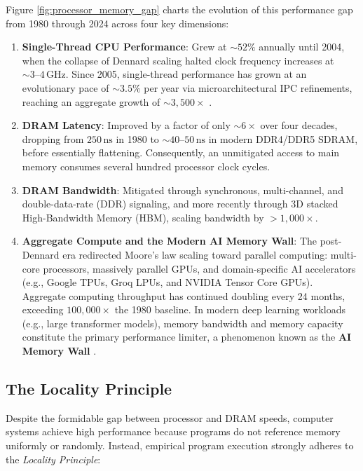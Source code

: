 Figure \ref{fig:processor_memory_gap} charts the evolution of this performance gap from 1980 through 2024 across four key dimensions:
\begin{enumerate}
    \item \textbf{Single-Thread CPU Performance}: Grew at $\sim 52\%$ annually until 2004, when the collapse of Dennard scaling halted clock frequency increases at $\sim 3\text{--}4\,\text{GHz}$. Since 2005, single-thread performance has grown at an evolutionary pace of $\sim 3.5\%$ per year via microarchitectural IPC refinements, reaching an aggregate growth of $\sim 3,500\times$ \cite{rupp2020microprocessor}.
    \item \textbf{DRAM Latency}: Improved by a factor of only $\sim 6\times$ over four decades, dropping from $250\,\text{ns}$ in 1980 to $\sim 40\text{--}50\,\text{ns}$ in modern DDR4/DDR5 SDRAM, before essentially flattening. Consequently, an unmitigated access to main memory consumes several hundred processor clock cycles.
    \item \textbf{DRAM Bandwidth}: Mitigated through synchronous, multi-channel, and double-data-rate (DDR) signaling, and more recently through 3D stacked High-Bandwidth Memory (HBM), scaling bandwidth by $>1,000\times$.
    \item \textbf{Aggregate Compute and the Modern AI Memory Wall}: The post-Dennard era redirected Moore's law scaling toward parallel computing: multi-core processors, massively parallel GPUs, and domain-specific AI accelerators (e.g., Google TPUs, Groq LPUs, and NVIDIA Tensor Core GPUs). Aggregate computing throughput has continued doubling every 24 months, exceeding $100,000\times$ the 1980 baseline. In modern deep learning workloads (e.g., large transformer models), memory bandwidth and memory capacity constitute the primary performance limiter, a phenomenon known as the \textbf{AI Memory Wall} \cite{gholami2021ai}.
\end{enumerate}

\subsection{The Locality Principle}\label{locprinc}

Despite the formidable gap between processor and DRAM speeds, computer systems achieve high performance because programs do not reference memory uniformly or randomly. Instead, empirical program execution strongly adheres to the \textit{Locality Principle}:

